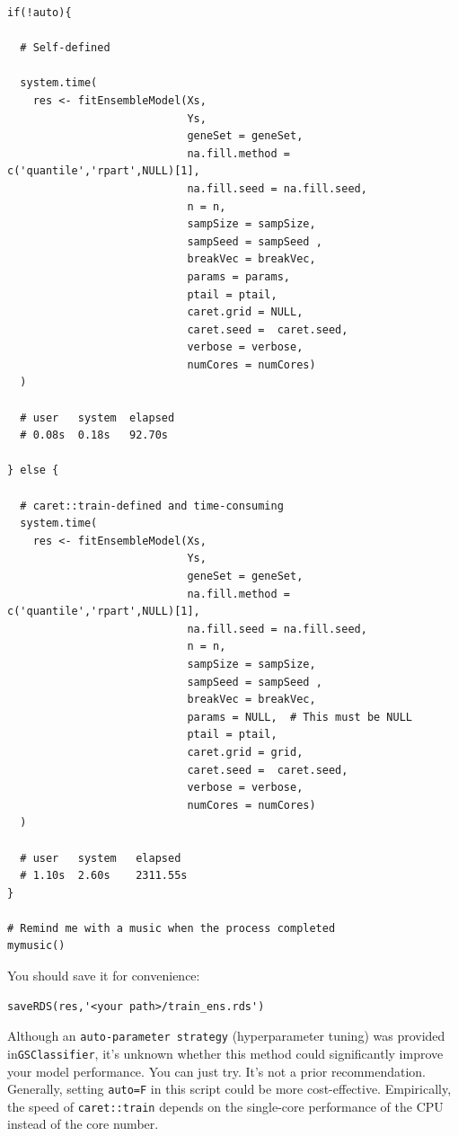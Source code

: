 \documentclass[
  12pt,
]{book}
\newcommand{\passthrough}[1]{#1}
\begin{document}
\begin{lstlisting}
if(!auto){
  
  # Self-defined
  
  system.time(
    res <- fitEnsembleModel(Xs,
                            Ys,
                            geneSet = geneSet,
                            na.fill.method = c('quantile','rpart',NULL)[1],
                            na.fill.seed = na.fill.seed,
                            n = n,
                            sampSize = sampSize,
                            sampSeed = sampSeed ,
                            breakVec = breakVec,
                            params = params,
                            ptail = ptail,
                            caret.grid = NULL,
                            caret.seed =  caret.seed,
                            verbose = verbose,
                            numCores = numCores)
  )
  
  # user   system  elapsed
  # 0.08s  0.18s   92.70s
  
} else {
  
  # caret::train-defined and time-consuming
  system.time(
    res <- fitEnsembleModel(Xs,
                            Ys,
                            geneSet = geneSet,
                            na.fill.method = c('quantile','rpart',NULL)[1],
                            na.fill.seed = na.fill.seed,
                            n = n,
                            sampSize = sampSize,
                            sampSeed = sampSeed ,
                            breakVec = breakVec,
                            params = NULL,  # This must be NULL
                            ptail = ptail,
                            caret.grid = grid,
                            caret.seed =  caret.seed,
                            verbose = verbose,
                            numCores = numCores)
  )
  
  # user   system   elapsed
  # 1.10s  2.60s    2311.55s
}

# Remind me with a music when the process completed
mymusic() 
\end{lstlisting}

You should save it for convenience:

\begin{lstlisting}
saveRDS(res,'<your path>/train_ens.rds')
\end{lstlisting}

Although an \passthrough{\lstinline!auto-parameter strategy!} (hyperparameter tuning) was provided in\passthrough{\lstinline!GSClassifier!}, it's unknown whether this method could significantly improve your model performance. You can just try. It's not a prior recommendation. Generally, setting \passthrough{\lstinline!auto=F!} in this script could be more cost-effective. Empirically, the speed of \passthrough{\lstinline!caret::train!} depends on the single-core performance of the CPU instead of the core number.
\end{document}
